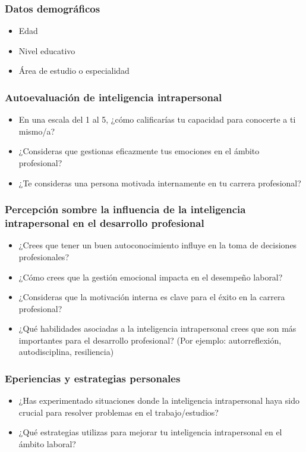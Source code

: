 \subsubsection{Datos demogr\'aficos}
\begin{itemize}
\item Edad
\item Nivel educativo
\item \'Area de estudio o especialidad
\end{itemize}
\subsubsection{Autoevaluaci\'on de inteligencia intrapersonal}
\begin{itemize}
\item  En una escala del 1 al 5, ¿cómo calificarías tu capacidad para conocerte a ti mismo/a?
\item  ¿Consideras que gestionas eficazmente tus emociones en el ámbito profesional? 
\item  ¿Te consideras una persona motivada internamente en tu carrera profesional? 
\end{itemize}
\subsubsection{Percepci\'on sombre la influencia de la inteligencia
intrapersonal en el desarrollo profesional}
\begin{itemize}
\item ¿Crees que tener un buen autoconocimiento influye en la toma de decisiones profesionales?
\item ¿Cómo crees que la gestión emocional impacta en el desempeño laboral?
\item ¿Consideras que la motivación interna es clave para el éxito en la carrera profesional?
\item ¿Qué habilidades asociadas a la inteligencia intrapersonal crees que son más importantes para el desarrollo profesional? (Por ejemplo: autorreflexión, autodisciplina, resiliencia)
\end{itemize}
\subsubsection{Eperiencias y estrategias personales}
\begin{itemize}
\item ¿Has experimentado situaciones donde la inteligencia intrapersonal haya sido crucial para resolver problemas en el trabajo/estudios?
\item ¿Qué estrategias utilizas para mejorar tu inteligencia intrapersonal en el ámbito laboral?
\end{itemize}
